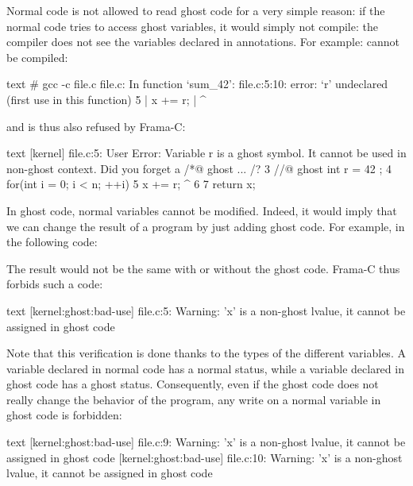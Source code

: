 Normal code is not allowed to read ghost code for a very simple reason:
if the normal code tries to access ghost variables,
it would simply not compile: the compiler does not see the variables
declared in annotations. For example:
cannot be compiled:
\begin{CodeBlock}{text}
# gcc -c file.c
file.c: In function ‘sum_42’:
file.c:5:10: error: ‘r’ undeclared (first use in this function)
    5 |     x += r;
      |          ^
\end{CodeBlock}
and is thus also refused by Frama-C:
\begin{CodeBlock}{text}
[kernel] file.c:5: User Error:
Variable r is a ghost symbol. It cannot be used in non-ghost context. Did you forget a /*@ ghost ... /?
  3       //@ ghost int r = 42 ;
  4       for(int i = 0; i < n; ++i){
  5         x += r;
                 ^
  6       }
  7       return x;
\end{CodeBlock}


In ghost code, normal variables cannot be modified. Indeed, it
would imply that we can change the result of a program by just
adding ghost code. For example, in the following code:




The result would not be the same with or without the ghost code.
Frama-C thus forbids such a code:


\begin{CodeBlock}{text}
[kernel:ghost:bad-use] file.c:5: Warning:
  'x' is a non-ghost lvalue, it cannot be assigned in ghost code
\end{CodeBlock}


Note that this verification is done thanks to the types of the different
variables. A variable declared in normal code has a normal status, while
a variable declared in ghost code has a ghost status. Consequently, even
if the ghost code does not really change the behavior of the program, any
write on a normal variable in ghost code is forbidden:




\begin{CodeBlock}{text}
[kernel:ghost:bad-use] file.c:9: Warning:
  'x' is a non-ghost lvalue, it cannot be assigned in ghost code
[kernel:ghost:bad-use] file.c:10: Warning:
  'x' is a non-ghost lvalue, it cannot be assigned in ghost code
\end{CodeBlock}



